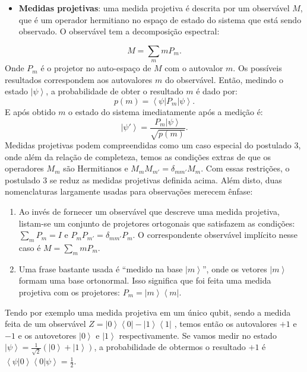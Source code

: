 \begin{itemize}
\item \textbf{Medidas projetivas}: uma medida projetiva é descrita por um observável $M$, que é um operador hermitiano no espaço de estado do sistema que está sendo observado. O observável tem a decomposição espectral:
\end{itemize}
\begin{equation}
M=\sum_{m}mP_{m}
. \end{equation}
Onde $P_{m}$ é o projetor no auto-espaço de $M$ com o autovalor $m$. Os possíveis resultados correspondem aos autovalores $m$ do observável. Então, medindo o estado $\left|\psi\right\rangle $, a probabilidade de obter o resultado $m$ é dado por:
\begin{equation}
p\left(m\right)=\left\langle \psi\left|P_{m}\right|\psi\right\rangle 
. \end{equation}
E após obtido $m$ o estado do sistema imediatamente após a medição é:
\begin{equation}
\left|\psi'\right\rangle = \frac{P_{m}\left|\psi\right\rangle }{\sqrt{p\left(m\right)}}
. \end{equation}
Medidas projetivas podem compreendidas como um caso especial do postulado 3, onde além da relação de completeza, temos as condições extras de que os operadores $M_{m}$ são Hermitianos e  $M_{m}M_{m'}=\delta_{mm'}M_{m}$. Com essas restrições, o postulado 3 se reduz as medidas projetivas definida acima. Além disto, duas nomenclaturas largamente usadas para observações merecem ênfase:
\begin{enumerate}
\item Ao invés de fornecer um observável que descreve uma medida projetiva, listam-se um conjunto de projetores ortogonais que satisfazem as condições: $\sum_{m}P_{m}=I$ e $P_{m}P_{m'}=\delta_{mm'}P_{m}.$ O correspondente observável implícito nesse caso é $M=\sum_{m}mP_{m}$.
\item Uma frase bastante usada é ``medido na base $\left|m\right\rangle $'', onde os vetores $\left|m\right\rangle $ formam uma base ortonormal. Isso significa que foi feita uma medida projetiva com os projetores: $P_{m}=\left|m\right\rangle \left\langle m\right|$.
\end{enumerate}

Tendo por exemplo uma medida projetiva em um único qubit, sendo a medida feita de um observável $Z=\left|0\right\rangle \left\langle 0\right|-\left|1\right\rangle \left\langle 1\right|$ , temos então os autovalores $+1$ e $-1$ e os autovetores $\left|0\right\rangle $ e $\left|1\right\rangle $ respectivamente. Se vamos medir no estado $\left|\psi\right\rangle =\frac{1}{\sqrt{2}}\left(\left|0\right\rangle +\left|1\right\rangle \right)$, a probabilidade de obtermos o resultado  $+1$  é $\left\langle \psi|0\right\rangle \left\langle 0|\psi\right\rangle =\frac{1}{2}$. 


